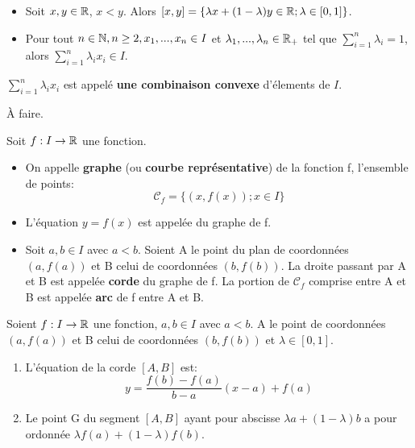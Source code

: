\documentclass[a4paper, 12pt]{article}
\begin{document}
\begin{corollaire}
    \begin{itemize}
        \item Soit $x, y \in \mathbb{R}$, $x < y$. Alors $[x, y] = \{\lambda x + (1 - \lambda)y \in \mathbb{R}; \lambda \in [0, 1]\}$.
        \item Pour tout $n \in \mathbb{N}, n \geq 2, x_1, ..., x_n \in I$ et $\lambda_1, ..., \lambda_n \in \mathbb{R}_+$ tel que $\sum_{i=1}^{n}\lambda_i = 1$, alors $\sum_{i=1}^{n}\lambda_ix_i \in I$.
    \end{itemize}
\end{corollaire}

\begin{remark}
    $\sum_{i=1}^{n}\lambda_i x_i$ est appelé \textbf{une combinaison convexe} d'élements de $I$.
\end{remark}

\begin{demonstration}
    À faire.
\end{demonstration}

\begin{definition}
    Soit $f: I \rightarrow \mathbb{R}$ une fonction.
    \begin{itemize}
        \item On appelle \textbf{graphe} (ou \textbf{courbe représentative}) de la fonction f, l'ensemble de points:
        $$
        \mathscr{C}_f = \{(x, f(x)); x \in I\}
        $$
        \item L'équation $y = f(x)$ est appelée  du graphe de f.
        \item Soit $a, b \in I$ avec $a \lt b$. Soient A le point du plan de coordonnées $(a, f(a))$ et B celui de coordonnées $(b, f(b))$.
        La droite passant par A et B est appelée \textbf{corde} du graphe de f.
        La portion de $\mathscr{C}_f$ comprise entre A et B est appelée \textbf{arc} de f entre A et B.
    \end{itemize}
\end{definition}

\begin{proposition}
    Soient $f: I \rightarrow \mathbb{R}$ une fonction, $a, b \in I$ avec $a \lt b$.
    A le point de coordonnées $(a, f(a))$ et B celui de coordonnées $(b, f(b))$ et $\lambda \in [0, 1]$.

    \begin{enumerate}
        \item L'équation de la corde $[A, B]$ est:
        $$
        y = \frac{f(b) - f(a)}{b - a}(x - a) + f(a)
        $$
        \item Le point G du segment $[A, B]$ ayant pour abscisse $\lambda a + (1 - \lambda)b$ a pour ordonnée $\lambda f(a) + (1 - \lambda) f(b)$.
    \end{enumerate}
\end{proposition}
\end{document}
